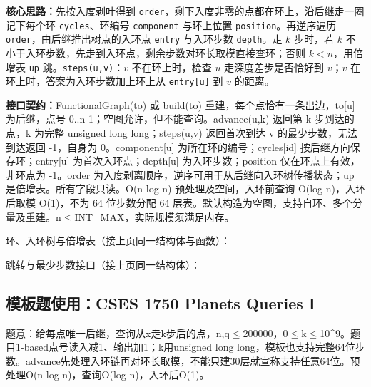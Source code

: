 \textbf{核心思路：}\allowbreak 先按入度剥叶得到 \texttt{order}，剩下入度非零的点都在环上，沿后继走一圈记下每个环 \texttt{cycles}、环编号 \texttt{component} 与环上位置 \texttt{position}。再逆序遍历 \texttt{order}，由后继推出树点的入环点 \texttt{entry} 与入环步数 \texttt{depth}。走 $k$ 步时，若 $k$ 不小于入环步数，先走到入环点，剩余步数对环长取模直接查环；否则 $k<n$，用倍增表 \texttt{up} 跳。\texttt{steps(u,v)}：$v$ 不在环上时，检查 $u$ 走深度差步是否恰好到 $v$；$v$ 在环上时，答案为入环步数加上环上从 \texttt{entry[u]} 到 $v$ 的距离。



{\sloppy{}\noindent\textbf{接口契约：}FunctionalGraph(to) 或 build(to) 重建，每个点恰有一条出边，to[u] 为后继，点号 0..n-1；空图允许，但不能查询。advance(u,k) 返回第 k 步到达的点，k 为完整 unsigned long long；steps(u,v) 返回首次到达 v 的最少步数，无法到达返回 -1，自身为 0。component[u] 为所在环的编号；cycles[id] 按后继方向保存环；entry[u] 为首次入环点；depth[u] 为入环步数；position 仅在环点上有效，非环点为 -1。order 为入度剥离顺序，逆序可用于从后继向入环树传播状态；up 是倍增表。所有字段只读。O(n log n) 预处理及空间，入环前查询 O(log n)，入环后取模 O(1)，不为 64 位步数分配 64 层表。默认构造为空图，支持自环、多个分量及重建。n$\le$INT\_MAX，实际规模须满足内存。\par}

\Needspace{387pt}



\newpage

\noindent 环、入环树与倍增表（接上页同一结构体与函数）：



\newpage

\noindent 跳转与最少步数接口（接上页同一结构体）：



\Needspace{404pt}

\subsection*{模板题使用：CSES 1750 Planets Queries I}

\label{usage-example-171}

题意：给每点唯一后继，查询从x走k步后的点，n,q$\le$200000，0$\le$k$\le$10\textasciicircum{}9。题目1-based点号读入减1、输出加1；k用unsigned long long，模板也支持完整64位步数。advance先处理入环链再对环长取模，不能只建30层就宣称支持任意64位。预处理O(n log n)，查询O(log n)，入环后O(1)。


